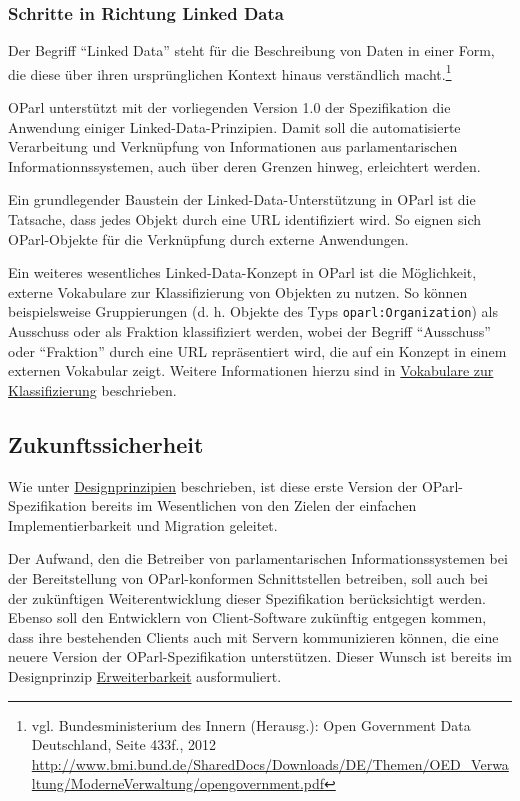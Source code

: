\documentclass[,a4paper]{article}
\begin{document}
\subsubsection{Schritte in Richtung Linked Data}\label{linkedux5fdata}

Der Begriff ``Linked Data'' steht für die Beschreibung von Daten in
einer Form, die diese über ihren ursprünglichen Kontext hinaus
verständlich macht.\footnote{vgl. Bundesministerium des Innern
  (Herausg.): Open Government Data Deutschland, Seite 433f., 2012
  \url{http://www.bmi.bund.de/SharedDocs/Downloads/DE/Themen/OED_Verwaltung/ModerneVerwaltung/opengovernment.pdf}}

OParl unterstützt mit der vorliegenden Version 1.0 der Spezifikation die
Anwendung einiger Linked-Data-Prinzipien. Damit soll die automatisierte
Verarbeitung und Verknüpfung von Informationen aus parlamentarischen
Informationnssystemen, auch über deren Grenzen hinweg, erleichtert
werden.

Ein grundlegender Baustein der Linked-Data-Unterstützung in OParl ist
die Tatsache, dass jedes Objekt durch eine URL identifiziert wird. So
eignen sich OParl-Objekte für die Verknüpfung durch externe Anwendungen.

Ein weiteres wesentliches Linked-Data-Konzept in OParl ist die
Möglichkeit, externe Vokabulare zur Klassifizierung von Objekten zu
nutzen. So können beispielsweise Gruppierungen (d. h. Objekte des Typs
\texttt{oparl:Organization}) als Ausschuss oder als Fraktion
klassifiziert werden, wobei der Begriff ``Ausschuss'' oder ``Fraktion''
durch eine URL repräsentiert wird, die auf ein Konzept in einem externen
Vokabular zeigt. Weitere Informationen hierzu sind in
\hyperref[vokabulareux5fklassifizierung]{Vokabulare zur Klassifizierung}
beschrieben.

\subsection{Zukunftssicherheit}\label{zukunftssicherheit}

Wie unter \hyperref[designprinzipien]{Designprinzipien} beschrieben, ist
diese erste Version der OParl-Spezifikation bereits im Wesentlichen von
den Zielen der einfachen Implementierbarkeit und Migration geleitet.

Der Aufwand, den die Betreiber von parlamentarischen
Informationssystemen bei der Bereitstellung von OParl-konformen
Schnittstellen betreiben, soll auch bei der zukünftigen
Weiterentwicklung dieser Spezifikation berücksichtigt werden. Ebenso
soll den Entwicklern von Client-Software zukünftig entgegen kommen, dass
ihre bestehenden Clients auch mit Servern kommunizieren können, die eine
neuere Version der OParl-Spezifikation unterstützen. Dieser Wunsch ist
bereits im Designprinzip \hyperref[erweiterbarkeit]{Erweiterbarkeit}
ausformuliert.
\end{document}
